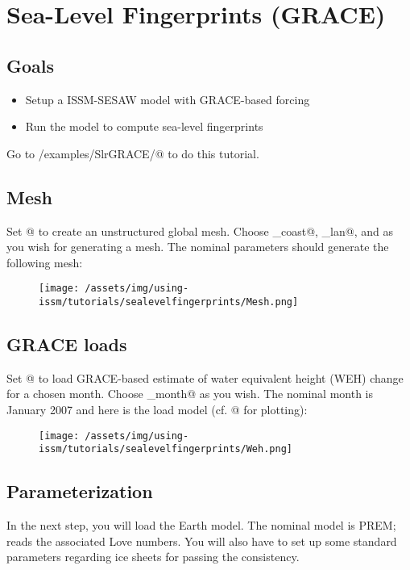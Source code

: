 \section{Sea-Level Fingerprints (GRACE)}
\subsection{Goals} %
\begin{itemize}
	\item Setup a ISSM-SESAW model with GRACE-based forcing
	\item Run the model to compute sea-level fingerprints
\end{itemize}

Go to \verb@trunk/examples/SlrGRACE/@ to do this tutorial.

\subsection{Mesh} %
Set @ to create an unstructured global mesh. Choose \verb@mindistance_coast@,
\verb@mindistance_lan@, and \verb@maxdistance@ as you wish for generating a mesh. The nominal
parameters should generate the following mesh:
\begin{figure}[H]
	\begin{center}
		\texttt{[image: /assets/img/using-issm/tutorials/sealevelfingerprints/Mesh.png]}
	\end{center}
\end{figure}
\subsection{GRACE loads} %
Set @ to load GRACE-based estimate of water equivalent height (WEH) change for a chosen
month. Choose \verb@year_month@ as you wish. The nominal month is January 2007 and here is the load
model (cf. @ for plotting):
\begin{figure}[H]
	\begin{center}
		\texttt{[image: /assets/img/using-issm/tutorials/sealevelfingerprints/Weh.png]}
	\end{center}
\end{figure}
\subsection{Parameterization} %
In the next step, you will load the Earth model. The nominal model is PREM; \verb@lovenumbers@ reads
the associated Love numbers. You will also have to set up some standard parameters regarding ice
sheets for passing the consistency.
